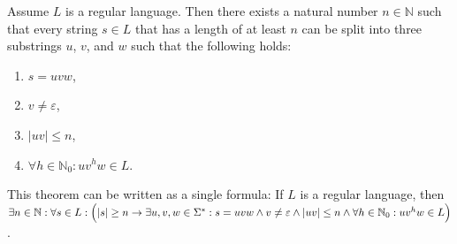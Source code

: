\begin{Theorem} \lb
  Assume $L$ is a regular language.  Then there exists a natural number $n \in \mathbb{N}$ such that
  every string $s \in L$ that has a length of at least $n$ can be split into three substrings $u$,
  $v$, and $w$ such that the following holds:
  \begin{enumerate}
  \item $s= uvw$,
  \item $v \not= \varepsilon$,
  \item $|uv| \leq n$,
  \item $\forall h \in \mathbb{N}_0: uv^hw \in L$.
  \end{enumerate}
  This theorem can be written as a single formula:  If $L$ is a regular language, then 
  \\[0.2cm]
  \hspace*{1.3cm}
  $\exists n \in \mathbb{N}: \forall s \in L : \Bigl(|s| \geq n \rightarrow \exists u,v,w\in \Sigma^* :
   s = uvw \wedge v \not= \varepsilon \wedge |uv| \leq n \wedge 
    \forall h \in \mathbb{N}_0: uv^h w \in L
   \Bigr)
  $.
\end{Theorem}

